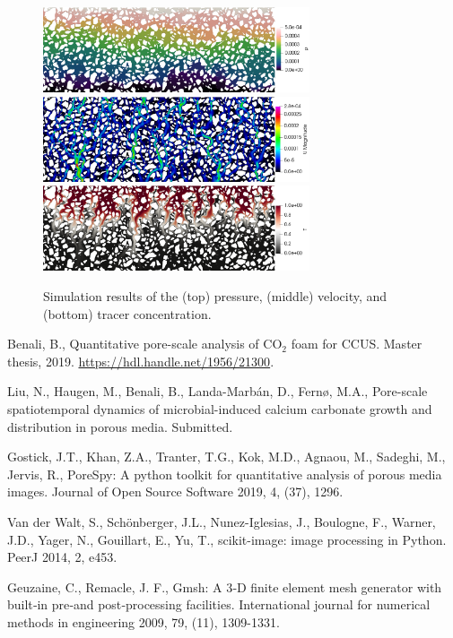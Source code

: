 \documentclass[10pt]{article}
\begin{document}
\begin{figure}[h!]
\centering
\includegraphics[width=0.7\textwidth]{pressure}
\includegraphics[width=0.7\textwidth]{velocity}
\includegraphics[width=0.7\textwidth]{tracer}
\caption{Simulation results of the (top) pressure, (middle) velocity, and (bottom) tracer concentration.}
\label{simulations} 
\end{figure}

\begin{thebibliography}{}

Benali, B., 
Quantitative pore-scale analysis of CO$_2$ foam for CCUS.
Master thesis,
2019.
\href{https://hdl.handle.net/1956/21300}{https://hdl.handle.net/1956/21300}.

Liu, N., Haugen, M., Benali, B., Landa-Marbán, D., Fernø, M.A., 
Pore-scale spatiotemporal dynamics of microbial-induced calcium carbonate growth and distribution in porous media.
Submitted.

Gostick, J.T., Khan, Z.A., Tranter, T.G., Kok, M.D., Agnaou, M., Sadeghi, M., Jervis, R., 
PoreSpy: A python toolkit for quantitative analysis of porous media images.
Journal of Open Source Software 2019, 4, (37), 1296.

Van der Walt, S., Schönberger, J.L., Nunez-Iglesias, J., Boulogne, F., Warner, J.D., Yager, N., Gouillart, E., Yu, T., 
scikit-image: image processing in Python. 
PeerJ 2014, 2, e453.

Geuzaine, C., Remacle, J. F., 
Gmsh: A 3‐D finite element mesh generator with built‐in pre‐and post‐processing facilities.
International journal for numerical methods in engineering 2009, 79, (11), 1309-1331.

\end{thebibliography}
\end{document}
